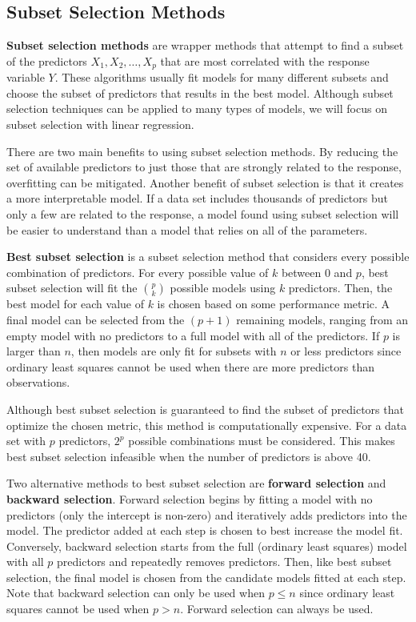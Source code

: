 \documentclass{article}
\begin{document}
\subsection{Subset Selection Methods}

\textbf{Subset selection methods} are wrapper methods that attempt to find a subset of the predictors $X_1, X_2, \dotsc, X_p$ that are most correlated with the response variable $Y$. These algorithms usually fit models for many different subsets and choose the subset of predictors that results in the best model. Although subset selection techniques can be applied to many types of models, we will focus on subset selection with linear regression.

There are two main benefits to using subset selection methods. By reducing the set of available predictors to just those that are strongly related to the response, overfitting can be mitigated. Another benefit of subset selection is that it creates a more interpretable model. If a data set includes thousands of predictors but only a few are related to the response, a model found using subset selection will be easier to understand than a model that relies on all of the parameters. 

\textbf{Best subset selection} is a subset selection method that considers every possible combination of predictors. For every possible value of $k$ between 0 and $p$, best subset selection will fit the ${p\choose k}$ possible models using $k$ predictors. Then, the best model for each value of $k$ is chosen based on some performance metric. A final model can be selected from the $(p + 1)$ remaining models, ranging from an empty model with no predictors to a full model with all of the predictors. If $p$ is larger than $n$, then models are only fit for subsets with $n$ or less predictors since ordinary least squares cannot be used when there are more predictors than observations.

Although best subset selection is guaranteed to find the subset of predictors that optimize the chosen metric, this method is computationally expensive. For a data set with $p$ predictors, $2^p$ possible combinations must be considered. This makes best subset selection infeasible when the number of predictors is above 40.

Two alternative methods to best subset selection are \textbf{forward selection} and \textbf{backward selection}. Forward selection begins by fitting a model with no predictors (only the intercept is non-zero) and iteratively adds predictors into the model. The predictor added at each step is chosen to best increase the model fit. Conversely, backward selection starts from the full (ordinary least squares) model with all $p$ predictors and repeatedly removes predictors. Then, like best subset selection, the final model is chosen from the candidate models fitted at each step. Note that backward selection can only be used when $p\leq n$ since ordinary least squares cannot be used when $p>n$. Forward selection can always be used.
\end{document}

